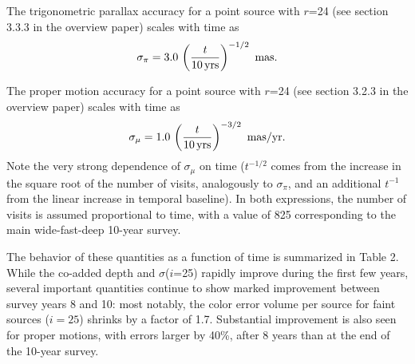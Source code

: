 \documentclass[DM,toc,usenatbib]{lsstdoc}
\begin{document}
The trigonometric parallax accuracy for a point source with $r$=24 (see section 3.3.3 in the 
overview paper) scales with time as 
\begin{equation}
        \sigma_\pi = 3.0 \,  \left({t \over 10 \, {\rm yrs}}\right)^{-1/2}  \,\,  {\rm mas.} 
\end{equation}

The proper motion accuracy for a point source with $r$=24 (see section 3.2.3 in the overview paper)
scales with time as 
\begin{equation}
        \sigma_\mu = 1.0 \,  \left({t \over 10 \, {\rm yrs}}\right)^{-3/2}   \,\, {\rm mas/yr.} 
\end{equation}
Note the very strong dependence of  $\sigma_\mu$ on time ($t^{-1/2}$ comes from the
increase in the square root of the number of visits, analogously to $\sigma_\pi$, and 
an additional $t^{-1}$ from the linear increase in temporal baseline).  In both expressions,
the number of visits is assumed proportional to time, with a value of 825 corresponding to the 
main wide-fast-deep 10-year survey. 

The behavior of these quantities as a function of time is summarized in Table 2. While 
the co-added depth and $\sigma$($i$=25) rapidly improve during the first few years, 
several important quantities continue to show marked improvement between survey 
years 8 and 10: most notably, the color error volume per source for faint sources ($i=25$) 
shrinks by a factor of 1.7.  Substantial improvement is also seen for proper motions, 
with errors larger by 40\%, after 8 years than at the end of the 10-year survey.  
\end{document}
